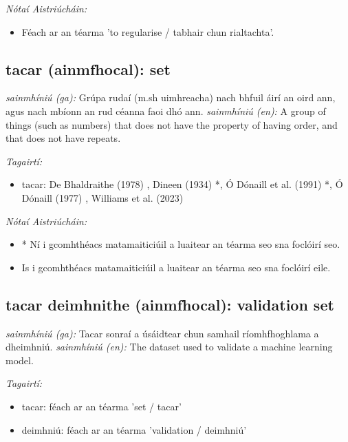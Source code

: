 \documentclass{article}
\begin{document}
 \noindent \textit{Nótaí Aistriúcháin:}
\begin{itemize}
	\item Féach ar an téarma 'to regularise / tabhair chun rialtachta'.
\end{itemize}


\subsection*{tacar (ainmfhocal): set} 
 \noindent \textit{sainmhíniú (ga):} Grúpa rudaí (m.sh uimhreacha) nach bhfuil áirí an oird ann, agus nach mbíonn an rud céanna faoi dhó ann.
\newline\newline
 \noindent \textit{sainmhíniú (en):} A group of things (such as numbers) that does not have the property of having order, and that does not have repeats.
\newline

 \noindent \textit{Tagairtí:}
\begin{itemize}
	\item tacar: De Bhaldraithe (1978) \cite{de-bhaldraithe}, Dineen (1934) \cite{dineen}*, Ó Dónaill et al. (1991) \cite{focloir-beag}*, Ó Dónaill (1977) \cite{odonaill}, Williams et al. (2023) \cite{storchiste}
\end{itemize}

 \noindent \textit{Nótaí Aistriúcháin:}
\begin{itemize}
	\item * Ní i gcomhthéacs matamaiticiúil a luaitear an téarma seo sna foclóirí seo.
	\item Is i gcomhthéacs matamaiticiúil a luaitear an téarma seo sna foclóirí eile.
\end{itemize}


\subsection*{tacar deimhnithe (ainmfhocal): validation set} 
 \noindent \textit{sainmhíniú (ga):} Tacar sonraí a úsáidtear chun samhail ríomhfhoghlama a dheimhniú.
\newline\newline
 \noindent \textit{sainmhíniú (en):} The dataset used to validate a machine learning model.
\newline

 \noindent \textit{Tagairtí:}
\begin{itemize}
	\item tacar: féach ar an téarma 'set / tacar'
	\item deimhniú: féach ar an téarma 'validation / deimhniú'
\end{itemize}
\end{document}
